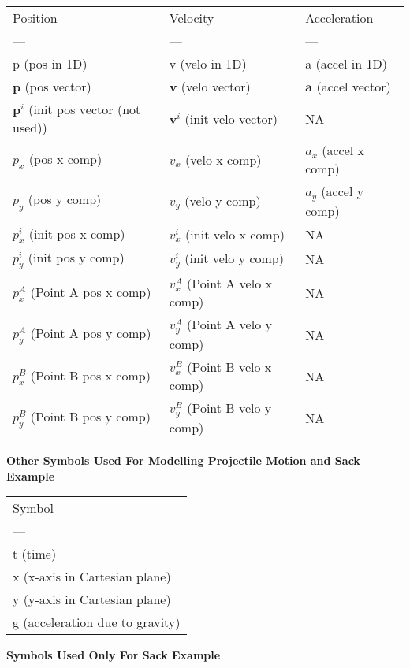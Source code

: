 \documentclass[11pt]{article}
\begin{document}
\begin{center}
\begin{tabular}{lll}
Position & Velocity & Acceleration\\
--- & --- & ---\\
p (pos in 1D) & v (velo in 1D) & a (accel in 1D)\\
\(\mathbf{p}\) (pos vector) & \(\mathbf{v}\) (velo vector) & \(\mathbf{a}\) (accel vector)\\
\(\mathbf{p}^i\) (init pos vector (not used)) & \(\mathbf{v}^i\) (init velo vector) & NA\\
\(p_x\) (pos x comp) & \(v_x\) (velo x comp) & \(a_x\) (accel x comp)\\
\(p_y\) (pos y comp) & \(v_y\) (velo y comp) & \(a_y\) (accel y comp)\\
\(p_x^i\) (init pos x comp) & \(v_x^i\) (init velo x comp) & NA\\
\(p_y^i\) (init pos y comp) & \(v_y^i\) (init velo y comp) & NA\\
\(p_x^A\) (Point A pos x comp) & \(v_x^A\) (Point A velo x comp) & NA\\
\(p_y^A\) (Point A pos y comp) & \(v_y^A\) (Point A velo y comp) & NA\\
\(p_x^B\) (Point B pos x comp) & \(v_x^B\) (Point B velo x comp) & NA\\
\(p_y^B\) (Point B pos y comp) & \(v_y^B\) (Point B velo y comp) & NA\\
\end{tabular}
\end{center}

\textbf{Other Symbols Used For Modelling Projectile Motion and Sack Example}

\begin{center}
\begin{tabular}{l}
Symbol\\
---\\
t (time)\\
x (x-axis in Cartesian plane)\\
y (y-axis in Cartesian plane)\\
g (acceleration due to gravity)\\
\end{tabular}
\end{center}

\textbf{Symbols Used Only For Sack Example}
\end{document}
